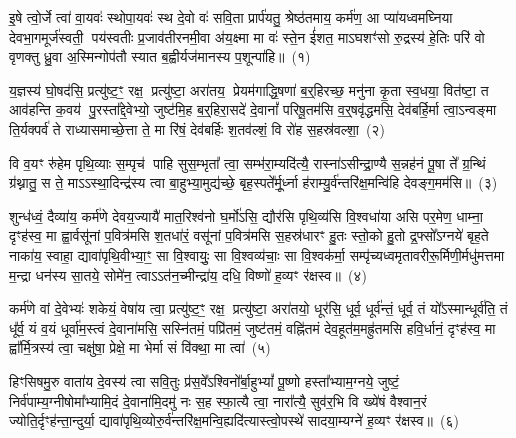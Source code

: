 \setcounter{anuvakam}{0}
इ॒षे त्वो॒र्जे त्वा॑ वा॒यवः॑ स्थोपा॒यवः॑ स्थ दे॒वो वः॑ सवि॒ता प्रार्प॑यतु॒ श्रेष्ठ॑तमाय॒ कर्म॑ण॒ आ प्या॑यध्वमघ्निया देवभा॒गमूर्ज॑स्वती॒ पय॑स्वतीः प्र॒जाव॑तीरनमी॒वा अ॑य॒क्ष्मा मा वः॑ स्ते॒न ई॑शत॒ मा\-ऽघशꣳ॑सो रु॒द्रस्य॑ हे॒तिः परि॑ वो वृणक्तु ध्रु॒वा अ॒स्मिन्गोप॑तौ स्यात ब॒ह्वीर्यज॑मानस्य प॒शून्पा॑हि॥~(१)

{\anuvakamend[{इ॒षे त्रिच॑त्वारिꣳशत्}]}

य॒ज्ञस्य॑ घो॒षद॑सि॒ प्रत्यु॑ष्ट॒ꣳ॒ रक्ष॒ प्रत्यु॑ष्टा॒ अरा॑तय॒ प्रेयम॑गाद्धि॒षणा॑ ब॒र्॒हिरच्छ॒ मनु॑ना कृ॒ता स्व॒धया॒ वित॑ष्टा॒ त आव॑हन्ति क॒वय॑ पु॒रस्ता᳚द्दे॒वेभ्यो॒ जुष्ट॑मि॒ह ब॒र्॒हिरा॒सदे॑ दे॒वानां᳚ परिषू॒तम॑सि व॒र्॒षवृ॑द्धमसि॒ देव॑बर्\mbox{}हि॒र्मा त्वा॒\-ऽन्वङ्मा ति॒र्यक्पर्व॑ ते राध्यासमाच्छे॒त्ता ते॒ मा रि॑षं॒ देव॑बर्\mbox{}हिः श॒तव॑ल्\mbox{}शं॒ वि रो॑ह स॒हस्र॑वल्\mbox{}शा॒~(२)

वि व॒यꣳ रु॑हेम पृथि॒व्याः स॒म्पृच॑ पाहि सुस॒म्भृता᳚ त्वा॒ सम्भ॑रा॒म्यदि॑त्यै॒ रास्ना॑\-ऽसीन्द्रा॒ण्यै स॒न्नह॑नं पू॒षा ते᳚ ग्र॒न्थिं ग्र॑थ्नातु॒ स ते॒ मा\-ऽ\-ऽस्था॒दिन्द्र॑स्य त्वा बा॒हुभ्या॒मुद्य॑च्छे॒ बृह॒स्पते᳚र्मू॒र्ध्ना ह॑राम्यु॒र्व॑न्तरि॑क्ष॒मन्वि॑हि देवङ्ग॒मम॑सि॥~(३)

{\anuvakamend[{स॒हस्र॑वल्\mbox{}शा अ॒ष्टात्रिꣳ॑शच्च}]}

शुन्ध॑ध्वं॒ दैव्या॑य॒ कर्म॑णे देवय॒ज्यायै॑ मात॒रिश्व॑नो घ॒र्मो॑\-ऽसि॒ द्यौर॑सि पृथि॒व्य॑सि वि॒श्वधा॑या असि पर॒मेण॒ धाम्ना॒ दृꣳह॑स्व॒ मा ह्वा॒र्वसू॑नां प॒वित्र॑मसि श॒तधा॑रं॒ वसू॑नां प॒वित्र॑मसि स॒हस्र॑धारꣳ हु॒तः स्तो॒को हु॒तो द्र॒फ्सो᳚\-ऽग्नये॑ बृह॒ते नाका॑य॒ स्वाहा॒ द्यावा॑पृथि॒वीभ्या॒ꣳ॒ सा वि॒श्वायुः॒ सा वि॒श्वव्य॑चाः॒ सा वि॒श्वक॑र्मा॒ सम्पृ॑च्यध्वमृतावरीरू॒र्मिणी॒र्मधु॑मत्तमा म॒न्द्रा धन॑स्य सा॒तये॒ सोमे॑न॒ त्वा\-ऽ\-ऽत॑न॒च्मीन्द्रा॑य॒ दधि॒ विष्णो॑ ह॒व्यꣳ र॑क्षस्व॥~(४)

{\anuvakamend[{सोमे॑ना॒ष्टौ च॑}]}

कर्म॑णे वां दे॒वेभ्यः॑ शकेयं॒ वेषा॑य त्वा॒ प्रत्यु॑ष्ट॒ꣳ॒ रक्ष॒ प्रत्यु॑ष्टा॒ अरा॑तयो॒ धूर॑सि॒ धूर्व॒ धूर्व॑न्तं॒ धूर्व॒ तं यो᳚\-ऽस्मान्धूर्व॑ति॒ तं धू᳚र्व॒ यं व॒यं धूर्वा॑म॒स्त्वं दे॒वाना॑मसि॒ सस्नि॑तमं॒ पप्रि॑तमं॒ जुष्ट॑तमं॒ वह्नि॑तमं देव॒हूत॑म॒मह्रु॑तमसि हवि॒र्धानं॒ दृꣳह॑स्व॒ मा ह्वा᳚र्मि॒त्रस्य॑ त्वा॒ चक्षु॑षा॒ प्रेक्षे॒ मा भेर्मा सं वि॑क्था॒ मा त्वा॑~(५)

हिꣳसिषमु॒रु वाता॑य दे॒वस्य॑ त्वा सवि॒तुः प्र॑स॒वे᳚\-ऽश्विनो᳚र्बा॒हु\-भ्यां᳚ पू॒ष्णो हस्ता᳚भ्याम॒ग्नये॒ जुष्टं॒ निर्व॑पाम्य॒ग्नी\-षोमा᳚भ्यामि॒दं दे॒वाना॑मि॒दमु॑ नः स॒ह स्फा॒त्यै त्वा॒ नारा᳚त्यै॒ सुव॑र॒भि वि ख्ये॑षं वैश्वान॒रं ज्योति॒र्दृꣳह॑न्ता॒न्दुर्या॒ द्यावा॑\-पृथि॒व्योरु॒र्व॑न्तरि॑क्ष॒\-मन्वि॒ह्यदि॑त्यास्त्वो॒\-पस्थे॑ सादया॒म्यग्ने॑ ह॒व्यꣳ र॑क्षस्व॥~(६)

